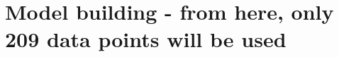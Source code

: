 \documentclass[a4paper,11pt]{article}
\begin{document}
\section*{Model building - from here, only 209 data points will be used}
% 
% 
% 
% 
% 
% 
\end{document}
